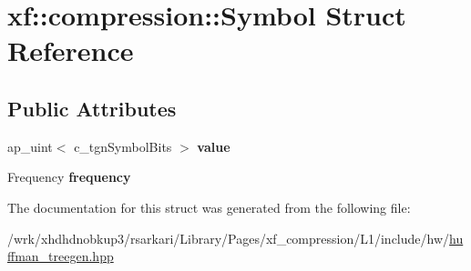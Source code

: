 \hypertarget{structxf_1_1compression_1_1Symbol}{\section{xf\-:\-:compression\-:\-:Symbol Struct Reference}
\label{structxf_1_1compression_1_1Symbol}
}
\subsection*{Public Attributes}
\begin{DoxyCompactItemize}
\item 
\hypertarget{structxf_1_1compression_1_1Symbol_abfb2379c9cebaad8fed374f5d95c99e0}{ap\-\_\-uint$<$ c\-\_\-tgn\-Symbol\-Bits $>$ {\bfseries value}}\label{structxf_1_1compression_1_1Symbol_abfb2379c9cebaad8fed374f5d95c99e0}

\item 
\hypertarget{structxf_1_1compression_1_1Symbol_aae386e791b6d55a0731e52bc6328806d}{Frequency {\bfseries frequency}}\label{structxf_1_1compression_1_1Symbol_aae386e791b6d55a0731e52bc6328806d}

\end{DoxyCompactItemize}


The documentation for this struct was generated from the following file\-:\begin{DoxyCompactItemize}
\item 
/wrk/xhdhdnobkup3/rsarkari/\-Library/\-Pages/xf\-\_\-compression/\-L1/include/hw/\hyperlink{huffman__treegen_8hpp}{huffman\-\_\-treegen.\-hpp}\end{DoxyCompactItemize}
